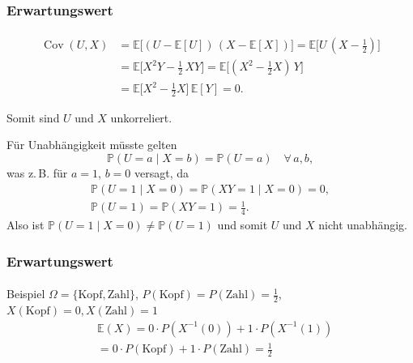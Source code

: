 \documentclass{beamer}
\renewcommand{\Pr}{\mathbb{P}}
\begin{document}
\begin{frame}
    \frametitle{Erwartungswert}
\framesubtitle{}


          \begin{align}
            \operatorname{Cov}(U,X)
            &= \mathbb{E}\bigl[(U - \mathbb{E}[U])\,(X - \mathbb{E}[X])\bigr]
             = \mathbb{E}\bigl[U\,(X - \tfrac12)\bigr] \\
            &= \mathbb{E}\bigl[X^2 Y - \tfrac12\,X Y\bigr]
             = \mathbb{E}\bigl[(X^2 - \tfrac12 X)\,Y\bigr] \\
             & = \mathbb{E}\bigl[X^2 - \tfrac12 X\bigr]\,\mathbb{E}[Y]
             = 0.
          \end{align}
          
          Somit sind $U$ und $X$ unkorreliert.
          
          
          Für Unabhängigkeit müsste gelten
          \[
            \Pr(U=a \mid X=b) = \Pr(U=a)
            \quad\forall\,a,b,
          \]
          was z.\,B. für $a=1$, $b=0$ versagt, da
          \begin{align*}          
            \Pr(U=1\mid X=0)
            = \Pr(XY=1\mid X=0)
            = 0,\\
            \Pr(U=1)
            = \Pr(XY=1)
            = \tfrac14.
          \end{align*}
          Also ist $\Pr(U=1\mid X=0)\neq\Pr(U=1)$ und somit $U$ und $X$ nicht unabhängig.
          
\end{frame}
 


\begin{frame}
    \frametitle{Erwartungswert}
\framesubtitle{}
\begin{block}{Beispiel}
$\Omega = \{ \text{Kopf},\text{Zahl}\}$, $P(\text{Kopf}) = P(\text{Zahl}) = \frac{1}{2}$, $X(\text{Kopf}) = 0,  X(\text{Zahl}) = 1$ 
\begin{align*}
& \mathbb{E}(X)  = 0 \cdot P(X^{-1}(0) ) + 1 \cdot P(X^{-1}(1)) \\
& =0  \cdot P(\text{Kopf}) + 1 \cdot P(\text{Zahl}) = \frac{1}{2}  
\end{align*}
\end{block}
 \end{frame}
\end{document}
